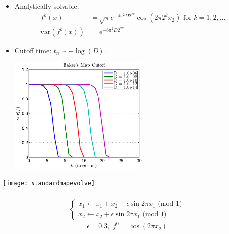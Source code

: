\documentclass[12pt,t]{beamer}
\begin{document}
\begin{frame}
  \begin{itemize}
  \item Analytically solvable:
    \begin{align*}
      f^k(x) &= \sqrt{\pi} e^{-4 \pi^2 D 2 ^{2 k}}\cos(2 \pi 2^k x_2)
      \text{ for } k = 1,2,\ldots \\
      \text{var}(f^k(x)) &= e^{-8 \pi^2 D 2^{2 k}}
    \end{align*}
  \item Cutoff time: $t_n \sim -\log(D).$
    \begin{center}
      \includegraphics[width=0.54\textwidth]{bakersmapcutoff}
    \end{center}
  \end{itemize}
\end{frame}
\begin{frame}

\centerline{
\texttt{[image: standardmapevolve]}
}
   \begin{align*}
   \\[-1cm]
     \begin{cases}
        x_1 \leftarrow x_1+x_2 +\epsilon \sin{2 \pi x_1}  \mbox{ (mod } 1)\\
        x_2 \leftarrow  x_2 +\epsilon \sin{2 \pi x_1}     \mbox{ (mod } 1)
     \end{cases}
   \end{align*}
   \begin{equation*}
      \epsilon=0.3, \,\, f^0   = \cos(2\pi x_2)
   \end{equation*}

\end{frame}
\end{document}
